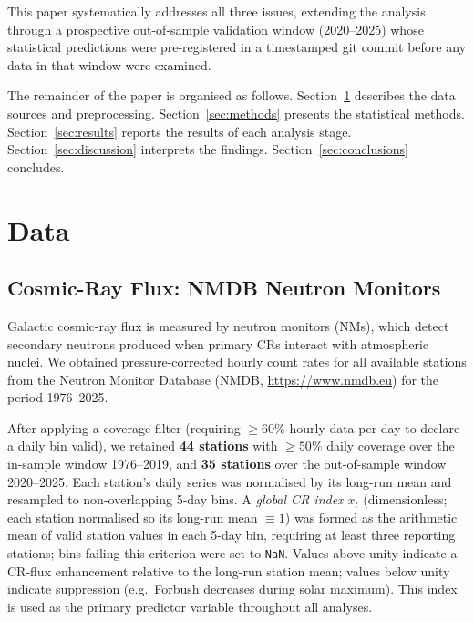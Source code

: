 \documentclass[12pt,a4paper]{article}
\begin{document}
This paper systematically addresses all three issues, extending the analysis
through a prospective out-of-sample validation window (2020--2025) whose
statistical predictions were pre-registered in a timestamped git commit
before any data in that window were examined.

The remainder of the paper is organised as follows.
Section~\ref{sec:data} describes the data sources and preprocessing.
Section~\ref{sec:methods} presents the statistical methods.
Section~\ref{sec:results} reports the results of each analysis stage.
Section~\ref{sec:discussion} interprets the findings.
Section~\ref{sec:conclusions} concludes.

\section{Data}
\label{sec:data}

\subsection{Cosmic-Ray Flux: NMDB Neutron Monitors}
\label{sec:nmdb}

Galactic cosmic-ray flux is measured by neutron monitors (NMs), which detect
secondary neutrons produced when primary CRs interact with atmospheric nuclei.
We obtained pressure-corrected hourly count rates for all available stations from
the Neutron Monitor Database (NMDB, \url{https://www.nmdb.eu}) for the period
1976--2025.

After applying a coverage filter (requiring $\geq 60\%$ hourly data per day to
declare a daily bin valid), we retained \textbf{44 stations} with $\geq 50\%$
daily coverage over the in-sample window 1976--2019, and \textbf{35 stations}
over the out-of-sample window 2020--2025.
Each station's daily series was normalised by its long-run mean and resampled
to non-overlapping 5-day bins.
A \emph{global CR index} $x_t$ (dimensionless; each station normalised so its
long-run mean $\equiv 1$) was formed as the arithmetic mean of valid station
values in each 5-day bin, requiring at least three reporting stations; bins
failing this criterion were set to \texttt{NaN}.
Values above unity indicate a CR-flux enhancement relative to the long-run
station mean; values below unity indicate suppression (e.g.\ Forbush decreases
during solar maximum).
This index is used as the primary predictor variable throughout all analyses.
\end{document}
